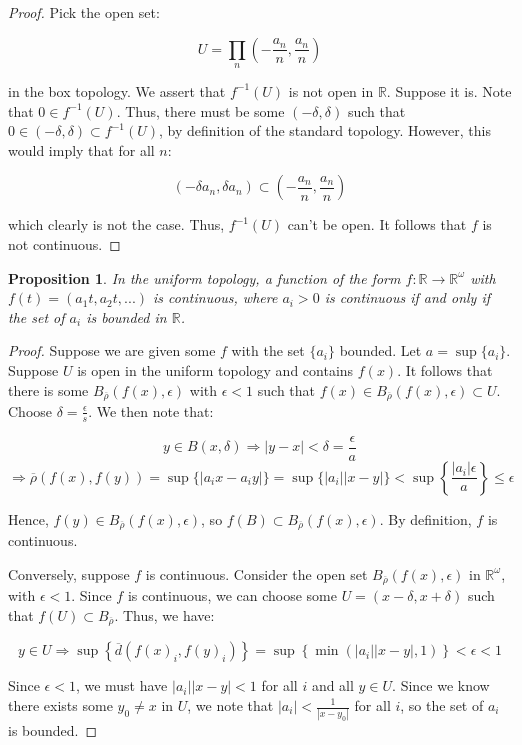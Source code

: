 \documentclass[10pt, oneside]{amsart}
\newtheorem{prop}{Proposition}
\begin{document}
    \begin{proof}
      Pick the open set:

      $$U = \displaystyle\prod_{n} \left( -\frac{a_n}{n}, \frac{a_n}{n} \right)$$

      in the box topology. We assert that $f^{-1}(U)$ is not open in $\mathbb{R}$. Suppose it is. Note that $0 \in f^{-1}(U)$. Thus, there must be some $(-\delta, \delta)$ such that $0 \in (-\delta, \delta) \subset f^{-1}(U)$, by definition
      of the standard topology. However, this would imply that for all $n$:

      $$(-\delta a_n, \delta a_n) \subset \left( -\frac{a_n}{n}, \frac{a_n}{n} \right)$$

      which clearly is not the case. Thus, $f^{-1}(U)$ can't be open. It follows that $f$ is not continuous.
    \end{proof}

    \begin{prop}
      In the uniform topology, a function of the form $f : \mathbb{R} \rightarrow \mathbb{R}^{\omega}$ with $f(t) = (a_1 t, a_2 t, ...)$ is continuous, where $a_i > 0$ is continuous if and only if the set of $a_i$ is bounded in $\mathbb{R}$.
    \end{prop}

    \begin{proof}
      Suppose we are given some $f$ with the set $\{a_i\}$ bounded. Let $a = \sup \{a_i\}$. Suppose $U$ is open in the uniform topology and contains $f(x)$. It follows that there is some $B_{\overline{\rho}}(f(x), \epsilon)$
      with $\epsilon < 1$ such that $f(x) \in B_{\overline{\rho}}(f(x), \epsilon) \subset U$. Choose $\delta = \frac{\epsilon}{s}$. We then note that:

      $$y \in B(x, \delta) \Rightarrow |y - x| < \delta = \frac{\epsilon}{a}$$
      $$\Rightarrow \overline{\rho}(f(x), f(y)) = \sup \{ |a_i x - a_i y | \} = \sup \{ |a_i| |x - y| \} < \sup \left\{ \frac{|a_i| \epsilon}{a} \right\} \leq \epsilon$$

      Hence, $f(y) \in B_{\overline{\rho}}(f(x), \epsilon)$, so $f(B) \subset B_{\overline{\rho}}(f(x), \epsilon)$. By definition, $f$ is continuous.
      \newline

      Conversely, suppose $f$ is continuous. Consider the open set $B_{\overline{\rho}}(f(x), \epsilon)$ in $\mathbb{R}^{\omega}$, with $\epsilon < 1$. Since $f$ is continuous, we can choose some
      $U = (x - \delta, x + \delta)$ such that $f(U) \subset B_{\overline{\rho}}$. Thus, we have:

      $$y \in U \Rightarrow \sup \left\{ \overline{d}(f(x)_i, f(y)_i) \right\} = \sup \left\{ \min (|a_i||x - y|, 1) \right\} < \epsilon < 1$$

      Since $\epsilon < 1$, we must have $|a_i| | x - y | < 1$ for all $i$ and all $y \in U$. Since we know there exists some $y_0 \neq x$ in $U$, we note that $|a_i| < \frac{1}{|x - y_0|}$ for all $i$, so the set of $a_i$ is bounded.
    \end{proof}
\end{document}
